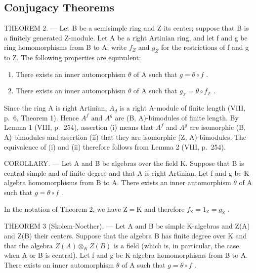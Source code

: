 \subsection{Conjugacy Theorems}

THEOREM 2. --- Let B be a semisimple ring and Z its center; suppose that B is a finitely generated Z-module. Let A be a right Artinian ring, and let f and g be ring homomorphisms from B to A; write \(f_{Z}\) and \(g_{Z}\) for the restrictions of f and g to Z. The following properties are equivalent:

\begin{enumerate}
\def\labelenumi{(\roman{enumi})}
\item
  There exists an inner automorphism \(\theta\) of A such that \(g = \theta \circ f\) .
\item
  There exists an inner automorphism \(\theta\) of A such that \(g_{\mathbb{Z}} = \theta \circ f_{\mathbb{Z}}\) .
\end{enumerate}

Since the ring A is right Artinian, \(A_{d}\) is a right A-module of finite length (VIII, p.~6, Theorem 1). Hence \(A^{f}\) and \(A^{g}\) are (B, A)-bimodules of finite length. By Lemma 1 (VIII, p.~254), assertion (i) means that \(A^{f}\) and \(A^{g}\) are isomorphic (B, A)-bimodules and assertion (ii) that they are isomorphic (Z, A)-bimodules. The equivalence of (i) and (ii) therefore follows from Lemma 2 (VIII, p.~254).

COROLLARY. --- Let A and B be algebras over the field K. Suppose that B is central simple and of finite degree and that A is right Artinian. Let f and g be K-algebra homomorphisms from B to A. There exists an inner automorphism \(\theta\) of A such that \(g = \theta \circ f\) .

In the notation of Theorem 2, we have \(\mathrm{Z} = \mathrm{K}\) and therefore \(f_{\mathrm{Z}} = 1_{\mathrm{Z}} = g_{\mathrm{Z}}\) .

THEOREM 3 (Skolem-Noether). --- Let A and B be simple K-algebras and Z(A) and Z(B) their centers. Suppose that the algebra B has finite degree over K and that the algebra \(Z(A) \otimes_{K} Z(B)\) is a field (which is, in particular, the case when A or B is central). Let f and g be K-algebra homomorphisms from B to A. There exists an inner automorphism \(\theta\) of A such that \(g = \theta \circ f\) .

